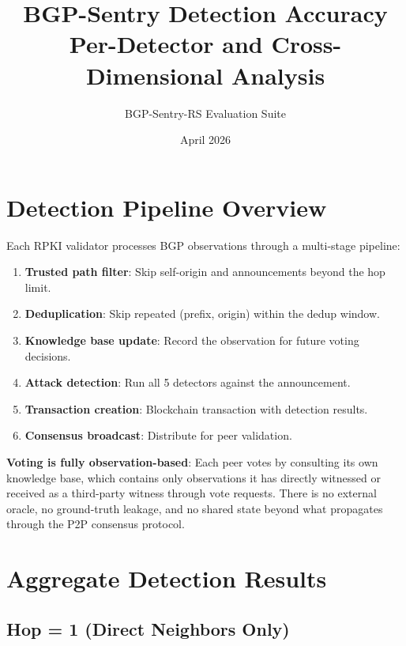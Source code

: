 \documentclass[11pt,a4paper]{article}
\title{\textbf{BGP-Sentry Detection Accuracy\\[0.3em]\large Per-Detector and Cross-Dimensional Analysis}}
\author{BGP-Sentry-RS Evaluation Suite}
\date{April 2026}
\begin{document}
\maketitle
\tableofcontents
\newpage

\section{Detection Pipeline Overview}

Each RPKI validator processes BGP observations through a multi-stage pipeline:
\begin{enumerate}
    \item \textbf{Trusted path filter}: Skip self-origin and announcements beyond the hop limit.
    \item \textbf{Deduplication}: Skip repeated (prefix, origin) within the dedup window.
    \item \textbf{Knowledge base update}: Record the observation for future voting decisions.
    \item \textbf{Attack detection}: Run all 5 detectors against the announcement.
    \item \textbf{Transaction creation}: Blockchain transaction with detection results.
    \item \textbf{Consensus broadcast}: Distribute for peer validation.
\end{enumerate}

\textbf{Voting is fully observation-based}: Each peer votes by consulting its own
knowledge base, which contains only observations it has directly witnessed or
received as a third-party witness through vote requests. There is no external
oracle, no ground-truth leakage, and no shared state beyond what propagates
through the P2P consensus protocol.

\section{Aggregate Detection Results}

\subsection{Hop = 1 (Direct Neighbors Only)}
\end{document}
